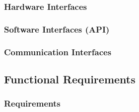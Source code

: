 \documentclass[english]{article}
\begin{document}
\subsubsection{Hardware Interfaces}

\subsubsection{Software Interfaces (API)}

\subsubsection{Communication Interfaces}

\newpage
\subsection{Functional Requirements}

\subsubsection{Requirements}
\end{document}
